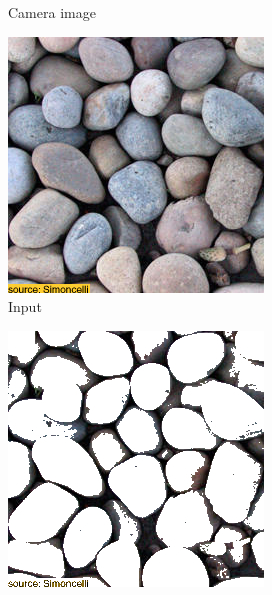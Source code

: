 \begin{figure}[]
\begin{subfigure}{\textwidth}
\begin{subfigure}{0.24\textwidth}
            \caption{Camera image}
            \label{fig:ex01-pebbles-1000steps-some_proj}
        \end{subfigure}
        
        \begin{subfigure}{0.24\textwidth}
            \centering
            \includegraphics[width=\textwidth]{images/04-experiment01/pebbles/target.jpg}
            \caption{Input}
            \label{fig:ex01-pebbles-1000steps-threshold_target}
        \end{subfigure}
        \hfill
        \begin{subfigure}{0.24\textwidth}
            \centering
            \includegraphics[width=\textwidth]{images/04-experiment01/pebbles/threshold_bg.jpg}

\end{subfigure}
\end{subfigure}
\end{figure}
